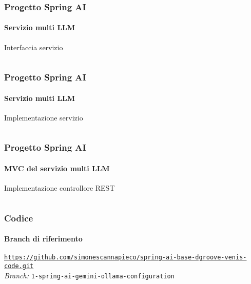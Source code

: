 %
\begin{frame}[t,fragile] \frametitle{Progetto Spring AI}
    \framesubtitle{Servizio multi LLM}
        \begin{block}{Interfaccia servizio}
			{\tiny\inputminted{java}{code/QuestionService.java}}
    	\end{block}
\end{frame}
%
\begin{frame}[t,fragile] \frametitle{Progetto Spring AI}
    \framesubtitle{Servizio multi LLM}
        \vspace*{-.7cm}
        \begin{block}{Implementazione servizio}
			{\tiny\inputminted{java}{code/QuestionServiceImpl.java}}
    	\end{block}
\end{frame}
%
\begin{frame}[t,fragile] \frametitle{Progetto Spring AI}
    \framesubtitle{MVC del servizio multi LLM}
    	\vspace*{-.7cm}
        \begin{block}{Implementazione controllore REST}
			{\tiny\inputminted{java}{code/QuestionController.java}}
    	\end{block}
\end{frame}
%
\begin{frame}[fragile] \frametitle{Codice}
    \framesubtitle{Branch di riferimento}
	\begin{center}
		{\scriptsize \href{https://github.com/simonescannapieco/spring-ai-advanced-dgroove-venis-code.git}{\texttt{https://github.com/simonescannapieco/spring-ai-base-dgroove-venis-code.git}}}\\
		\textit{Branch:} \alert{\texttt{1-spring-ai-gemini-ollama-configuration}}
	\end{center}
\end{frame}